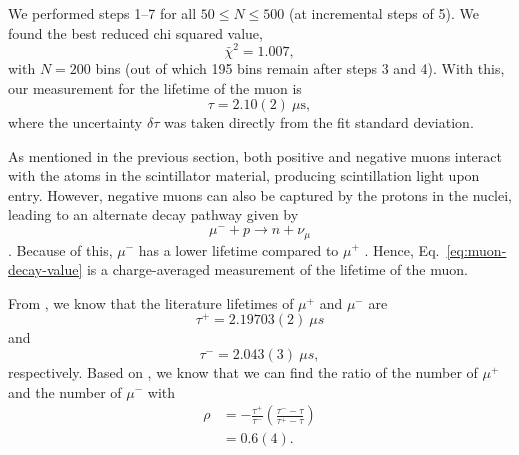 \documentclass{../paper}
\begin{document}
We performed steps 1--7 for all $50 \leq N \leq 500$ (at incremental steps of 5). We found the best reduced chi squared value,
\begin{equation}
  \bar\chi^2 = 1.007,
\end{equation}
with $N=200$ bins (out of which 195 bins remain after steps 3 and 4). With this, our measurement for the lifetime of the muon is
\begin{equation}\label{eq:muon-decay-value}
  \tau = 2.10(2) \ \mu\text{s},
\end{equation}
where the uncertainty $\delta\tau$ was taken directly from the fit standard deviation.

As mentioned in the previous section, both positive and negative muons interact with the atoms in the scintillator material, producing scintillation light upon entry. However, negative muons can also be captured by the protons in the nuclei, leading to an alternate decay pathway given by 
\begin{equation}
  \mu^- + p \to n + \nu_\mu
\end{equation}
\cite{TeachSpinManual}. Because of this, $\mu^-$ has a lower lifetime compared to $\mu^+$ \cite{TeachSpinManual}. Hence, Eq.~\eqref{eq:muon-decay-value} is a charge-averaged measurement of the lifetime of the muon.

From \cite{TeachSpinManual}, we know that the literature lifetimes of $\mu^+$ and $\mu^-$ are
\begin{equation}\label{eq:tau+}
  \tau^+ = 2.19703(2) \ \mu s
\end{equation}
and
\begin{equation}\label{eq:tau-}
  \tau^- = 2.043(3) \ \mu s,
\end{equation}
respectively. Based on \cite{TeachSpinManual}, we know that we can find the ratio of the number of $\mu^+$ and the number of $\mu^-$ with
\begin{align}
  \rho
  &= -\frac{\tau^+}{\tau^-} \left(\frac{\tau^- - \tau}{\tau^+ - \tau}\right) \\
  &= 0.6(4). \label{eq:ratio}
\end{align}
\end{document}
